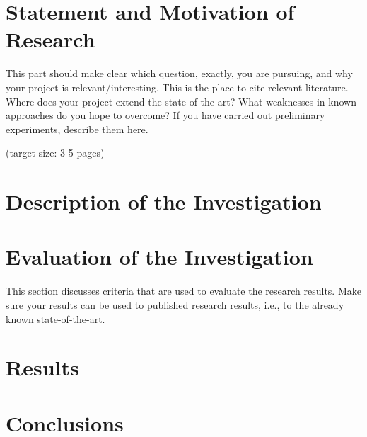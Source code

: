 \documentclass[a4paper,11pt,oneside]{article}
\begin{document}
  
  
  
  

  

  \newpage
  \tableofcontents

  \clearpage
  
  
  
  \section{Statement and Motivation of Research}

  This part should make clear which question, exactly, you are 
  pursuing, and why your project is relevant/interesting. This is the
  place to cite relevant literature. Where does your project extend
  the state of the art? What weaknesses in known approaches do you
  hope to overcome? If you have carried out preliminary experiments,
  describe them here.

  (target size: 3-5 pages)

 
  

  \section{Description of the Investigation}
  
  



  \section{Evaluation of the Investigation}

  This section discusses criteria that are used to evaluate the
  research results. Make sure your results can be used to published
  research results, i.e., to the already known state-of-the-art.
  
  \section{Results}
  



  \section{Conclusions}
 



\clearpage
\nocite{JS06}

  \newpage
  
  
\end{document}
